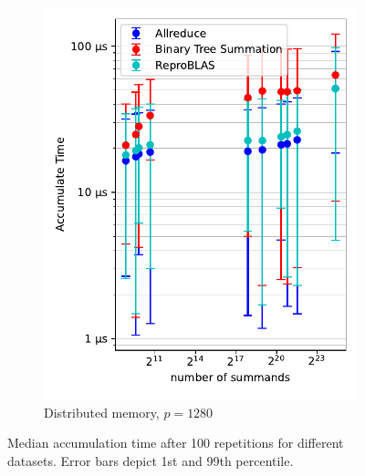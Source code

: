 \begin{figure}
\begin{subfigure}{0.49\textwidth}
\centering
\includegraphics[scale=0.72]{figures/benchmarkScatter1280.pdf}
\caption{Distributed memory, $p=1280$}
\label{fig:benchmarkOverview1280}
\end{subfigure}

\caption[Median accumulation time after 100 repetitions for different datasets.]{Median accumulation time after 100 repetitions for different datasets. Error bars depict 1st and 99th percentile.}
\label{fig:benchmarkOverview}
\end{figure}


